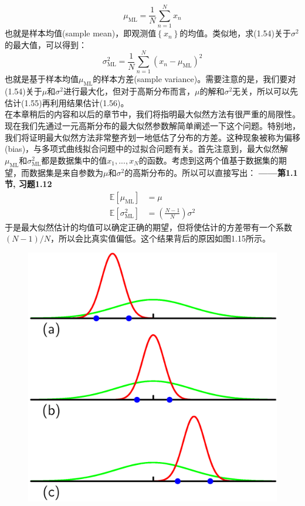\documentclass[b5paper]{book}
\numberwithin{equation}{chapter}
\begin{document}
{	\begin{equation}
		\mu_{\mathrm{ML}}=\frac{1}{N}\sum_{n=1}^{N}x_n
	\end{equation}
	\indent 也就是样本均值(sample mean)，即观测值$\left\{x_n\right\}$的均值。类似地，求(1.54)关于$\sigma^2$的最大值，可以得到：
	\begin{equation}
		\sigma_{\mathrm{ML}}^2=\frac{1}{N}\sum_{n=1}^{N}(x_n-\mu_{\mathrm{ML}})^2
	\end{equation}
	\indent 也就是基于样本均值$\mu_{\mathrm{ML}}$的样本方差(sample variance)。需要注意的是，我们要对(1.54)关于$\mu$和$\sigma^2$进行最大化，但对于高斯分布而言，$\mu$的解和$\sigma^2$无关，所以可以先估计(1.55)再利用结果估计(1.56)。\\
	\indent 在本章稍后的内容和以后的章节中，我们将指明最大似然方法有很严重的局限性。现在我们先通过一元高斯分布的最大似然参数解简单阐述一下这个问题。特别地，我们将证明最大似然方法非常整齐划一地低估了分布的方差。这种现象被称为偏移(bias)，与多项式曲线拟合问题中的过拟合问题有关。首先注意到，最大似然解$\mu_{\mathrm{ML}}$和$\sigma_{\mathrm{ML}}^2$都是数据集中的值$x_1,...,x_N$的函数。考虑到这两个值基于数据集的期望，而数据集是来自参数为$\mu$和$\sigma^2$的高斯分布的。所以可以直接写出：\color{red} \textbf{——第1.1节, 习题1.12}　\color{black}
	\begin{align}
		\mathbb{E}[\mu_{\mathrm{ML}}] &=\mu \\
		\mathbb{E}[\sigma_{\mathrm{ML}}^2]&=\left(\frac{N-1}{N}\right)\sigma^2
	\end{align}
	\indent 于是最大似然估计的均值可以确定正确的期望，但将使估计的方差带有一个系数$(N-1)/N$，所以会比真实值偏低。这个结果背后的原因如图1.15所示。
	\begin{figure}[ht]
		\centering
		\includegraphics[scale=0.8]{Images/1-15.png}

\end{figure}}
\end{document}
